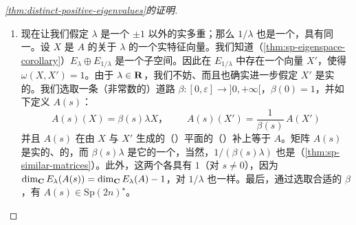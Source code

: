 \begin{proof}[\cref{thm:distinct-positive-eigenvalues}的证明]
\begin{enumerate}[label=(\arabic*)]
\begin{itemize}
  \item 若 $\omega(X,\overline{X})=0$，那么由于 $\omega$ 在 $E_\lambda\oplus E_{\overline{\lambda}}$ 上是辛的，存在\trGeneralizedEigenspace{} $E_\lambda(A)$ 中的一个向量 $Y$，使得 $\omega(X,\overline{Y})=1$ 且 $\omega(Y,\overline{Y})=0$。四个向量 $X,\overline{Y},\overline{X},Y$ 构成它们所生成的子空间 $F$ 的一组\trSymplectic{}基。我们再次利用一条类 $\cC^\infty$ 的道路 $\beta:[0,\varepsilon]\to\CC$，其中 $\beta(0)=1$，且对 $s>0$ 有 $\beta(s)\in\CC-S^1$，来设置
\[
\begin{aligned}
A(s)X&=\beta(s)\lambda X\text{，} & A(s)\overline{X}&=\overline{\beta}(s)\overline{\lambda}\,\overline{X}\text{，}\\
A(s)Y&=\frac{1}{\overline{\beta}(s)}\,AY\text{，} & A(s)\overline{Y}&=\frac{1}{\beta(s)}\,A\overline{Y}
\end{aligned}
\]
并且 $A(s)$ 在 $F^\circ$ 上等于 $A$。和前面一样，$A(s)\in\mathrm{Sp}(2n)^\star$，而且对 $\lambda$ 与 $\overline{\lambda}$ 以外的\trEigenvalue{}而言，诸\trGeneralizedEigenspace{}的维数保持不变。我们为矩阵 $A(s)$ 引进了新的\trEigenvalue{} $\beta(s)\lambda$ 与 $\overline{\beta(s)\lambda}\in\CC-(S^1-\RR)$，从而 $1/\beta(s)\lambda$ 与 $1/\overline{\beta(s)\lambda}$ 也是\trEigenvalue。\footnote{译注：原书本句首作 $\beta(s)\lambda$（$\lambda$ 无 $(s)$），随后却印作 $\overline{\beta}(s)\overline{\lambda}(s)\in\CC-(S^{1}-\RR)$，句内两个倒数亦作 $1/\beta(s)\lambda(s)$、$1/\overline{\beta}(s)\overline{\lambda}(s)$：$\lambda(s)$ 这一记号未定义且前后不一，疑均应为 $\beta(s)\lambda$（与本段 $A(s)X=\beta(s)\lambda X$ 一致）；译文按一致读法统一作 $\beta(s)\lambda$，此处径改。——译者注}$\lambda$ 的\trGeneralizedEigenspace{}（对 $\overline{\lambda}$ 也一样）的维数已被降低了 $2$，因此新的诸\trEigenvalue{}必须各具有\trMultiplicity{} $1$。
  \end{itemize}
\item 现在让我们假定 $\lambda$ 是一个 $\pm1$ 以外的实多重\trEigenvalue；那么 $1/\lambda$ 也是一个\trEigenvalue，具有同一\trMultiplicity。设 $X$ 是 $A$ 的关于\trEigenvalue{} $\lambda$ 的一个实特征向量。我们知道（\cref{thm:sp-eigenspace-corollary}）$E_\lambda\oplus E_{1/\lambda}$ 是一个\trSymplectic{}子空间。因此在 $E_{1/\lambda}$ 中存在一个向量 $X'$，使得 $\omega(X,X')=1$。由于 $\lambda\in\mathbf{R}$，我们不妨、而且也确实进一步假定 $X'$ 是实的。我们选取一条（非常数的）道路 $\beta:[0,\varepsilon]\to{]0,+\infty[}$，$\beta(0)=1$，并如下定义 $A(s)$：
\[
A(s)(X)=\beta(s)\lambda X\text{，}\qquad
A(s)(X')=\frac{1}{\beta(s)}\,A(X')
\]
并且 $A(s)$ 在由 $X$ 与 $X'$ 生成的（\trSymplectic{}）平面的（\trSymplectic{}）\trOrthogonal{}补上等于 $A$。矩阵 $A(s)$ 是实的、\trSymplectic{}的，而 $\beta(s)\lambda$ 是它的一个\trEigenvalue，当然，$1/(\beta(s)\lambda)$ 也是（\cref{thm:sp-similar-matrices}）。此外，这两个\trEigenvalue{}各具有\trMultiplicity{} $1$（对 $s\neq0$），因为 $\dim_{\mathbf{C}} E_\lambda(A(s))=\dim_{\mathbf{C}} E_\lambda(A)-1$，对 $1/\lambda$ 也一样。最后，通过选取合适的 $\beta$，有 $A(s)\in\mathrm{Sp}(2n)^\star$。

\end{enumerate}
\end{proof}
